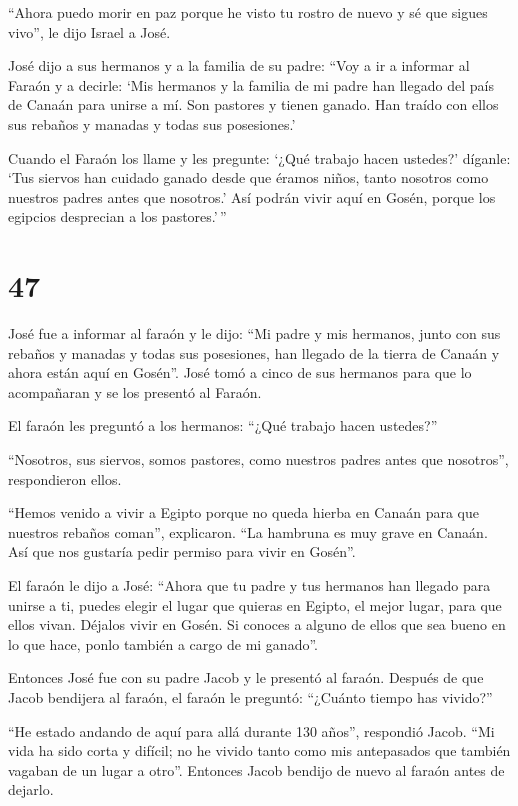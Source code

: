  ``Ahora puedo morir en paz porque he visto tu rostro de
nuevo y sé que sigues vivo'', le dijo Israel a José.

 José dijo a sus hermanos y a la familia de su padre: ``Voy
a ir a informar al Faraón y a decirle: `Mis hermanos y la familia de mi
padre han llegado del país de Canaán para unirse a mí.  Son
pastores y tienen ganado. Han traído con ellos sus rebaños y manadas y
todas sus posesiones.'

 Cuando el Faraón los llame y les pregunte: `¿Qué trabajo
hacen ustedes?'  díganle: `Tus siervos han cuidado ganado
desde que éramos niños, tanto nosotros como nuestros padres antes que
nosotros.' Así podrán vivir aquí en Gosén, porque los egipcios
desprecian a los pastores.'\,''

\hypertarget{section-46}{%
\section{47}\label{section-46}}

 José fue a informar al faraón y le dijo: ``Mi padre y mis
hermanos, junto con sus rebaños y manadas y todas sus posesiones, han
llegado de la tierra de Canaán y ahora están aquí en Gosén''.
 José tomó a cinco de sus hermanos para que lo acompañaran y
se los presentó al Faraón.

 El faraón les preguntó a los hermanos: ``¿Qué trabajo hacen
ustedes?''

``Nosotros, sus siervos, somos pastores, como nuestros padres antes que
nosotros'', respondieron ellos.

 ``Hemos venido a vivir a Egipto porque no queda hierba en
Canaán para que nuestros rebaños coman'', explicaron. ``La hambruna es
muy grave en Canaán. Así que nos gustaría pedir permiso para vivir en
Gosén''.

 El faraón le dijo a José: ``Ahora que tu padre y tus
hermanos han llegado para unirse a ti,  puedes elegir el
lugar que quieras en Egipto, el mejor lugar, para que ellos vivan.
Déjalos vivir en Gosén. Si conoces a alguno de ellos que sea bueno en lo
que hace, ponlo también a cargo de mi ganado''.

 Entonces José fue con su padre Jacob y le presentó al
faraón. Después de que Jacob bendijera al faraón,  el faraón
le preguntó: ``¿Cuánto tiempo has vivido?''

 ``He estado andando de aquí para allá durante 130 años'',
respondió Jacob. ``Mi vida ha sido corta y difícil; no he vivido tanto
como mis antepasados que también vagaban de un lugar a otro''.
 Entonces Jacob bendijo de nuevo al faraón antes de
dejarlo.

